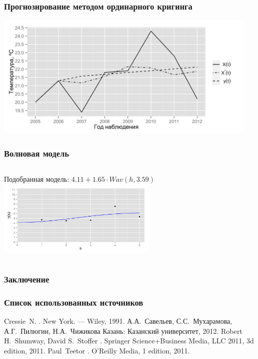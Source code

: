 \documentclass[10pt,pdf,aspectratio=169,hyperref={unicode}]{beamer}
\begin{document}
\begin{frame}
  \frametitle{Прогнозирование методом ординарного кригинга}
  \includegraphics[width=0.95\textwidth]{../../figures/variogram/auto-class-18-cross-prediction.png}
\end{frame}

\begin{frame}
  \frametitle{Волновая модель}
  \begin{columns}[c]
  \column{2in}
  Подобранная модель: $ 4.11 + 1.65 \cdot Wav(h, 3.59) $
  \column{3in}
   \includegraphics[width=3in]{../../figures/variogram/auto-rob-5-modeled.png}
  \end{columns}
\end{frame}

\begin{frame}
  \frametitle{Заключение}

\end{frame}

\begin{frame}
  \frametitle{Список использованных источников}
  \begin{scriptsize}
  \begin{thebibliography}{5}
    \beamertemplatebookbibitems
      Cressie~N.
      .
      \newblock New York. --- Wiley, 1991.
    \beamertemplatebookbibitems
      А.А.~Савельев, С.С.~Мухарамова, А.Г.~Пилюгин, Н.А.~Чижикова
      \newblock Казань: Казанский университет, 2012.
    \beamertemplatebookbibitems
      Robert H.~Shumway, David S.~Stoffer
      .
      \newblock Springer Science+Business Media, LLC 2011, 3d edition, 2011.
    \beamertemplatebookbibitems
      Paul~Teetor
      .
      \newblock O’Reilly Media, 1 edition, 2011.
  \end{thebibliography}
\end{scriptsize}
\end{frame}
\end{document}
